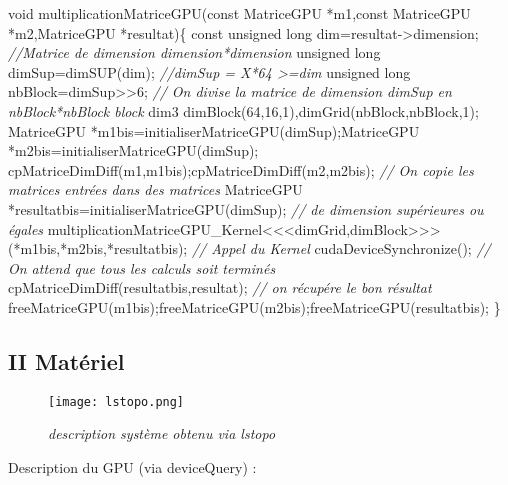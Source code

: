 \documentclass[]{article}
\newenvironment{Shaded}{\begin{snugshade}}{\end{snugshade}}
\newcommand{\DataTypeTok}[1]{\textcolor[rgb]{0.13,0.29,0.53}{{#1}}}
\newcommand{\DecValTok}[1]{\textcolor[rgb]{0.00,0.00,0.81}{{#1}}}
\newcommand{\CommentTok}[1]{\textcolor[rgb]{0.56,0.35,0.01}{\textit{{#1}}}}
\newcommand{\NormalTok}[1]{{#1}}
\begin{document}
\begin{Shaded}
\begin{Highlighting}[]
\DataTypeTok{void} \NormalTok{multiplicationMatriceGPU(}\DataTypeTok{const} \NormalTok{MatriceGPU *m1,}\DataTypeTok{const} \NormalTok{MatriceGPU *m2,MatriceGPU *resultat)\{}
    \DataTypeTok{const} \DataTypeTok{unsigned} \DataTypeTok{long} \NormalTok{dim=resultat->dimension; }\CommentTok{//Matrice de dimension dimension*dimension}
    \DataTypeTok{unsigned} \DataTypeTok{long} \NormalTok{dimSup=dimSUP(dim); }\CommentTok{//dimSup = X*64 >=dim}
    \DataTypeTok{unsigned} \DataTypeTok{long} \NormalTok{nbBlock=dimSup>>}\DecValTok{6}\NormalTok{; }\CommentTok{// On divise la matrice de dimension dimSup en nbBlock*nbBlock block}
    \NormalTok{dim3 dimBlock(}\DecValTok{64}\NormalTok{,}\DecValTok{16}\NormalTok{,}\DecValTok{1}\NormalTok{),dimGrid(nbBlock,nbBlock,}\DecValTok{1}\NormalTok{);}
        \NormalTok{MatriceGPU *m1bis=initialiserMatriceGPU(dimSup);MatriceGPU *m2bis=initialiserMatriceGPU(dimSup);}
        \NormalTok{cpMatriceDimDiff(m1,m1bis);cpMatriceDimDiff(m2,m2bis); }\CommentTok{// On copie les matrices entrées dans des matrices}
        \NormalTok{MatriceGPU *resultatbis=initialiserMatriceGPU(dimSup); }\CommentTok{// de dimension supérieures ou égales}
    \NormalTok{multiplicationMatriceGPU_Kernel<<<dimGrid,dimBlock>>>(*m1bis,*m2bis,*resultatbis); }\CommentTok{// Appel du Kernel}
    \NormalTok{cudaDeviceSynchronize(); }\CommentTok{// On attend que tous les calculs soit terminés}
        \NormalTok{cpMatriceDimDiff(resultatbis,resultat); }\CommentTok{// on récupére le bon résultat}
        \NormalTok{freeMatriceGPU(m1bis);freeMatriceGPU(m2bis);freeMatriceGPU(resultatbis);}
\NormalTok{\}}
\end{Highlighting}
\end{Shaded}

\subsection{II Matériel}\label{ii-materiel}

\begin{figure}[htbp]
\centering
\texttt{[image: lstopo.png]}
\caption{\emph{description système obtenu via lstopo}}
\end{figure}

Description du GPU (via deviceQuery) :
\end{document}
